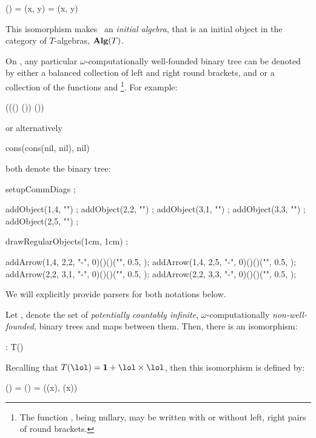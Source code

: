 \placeformula[+]\startformula\startalign
  \NC \alpha(\star) \NC =         \NR
  \NC \alpha(x, y)  \NC = (x, y) \NR
\stopalign\stopformula

\noindent This isomorphism makes \wflol\ an \emph{initial algebra}, 
that is an initial object in the category of $T$-algebras, 
$\bold{Alg}(T)$.

On , any particular $\omega$-computationally well-founded 
binary tree can be denoted by either a balanced collection of left and 
right round brackets, \quote{(} and \quote{)} or a collection of the 
functions  and \footnote{The function , 
being nullary, may be written with or without left, right pairs of round 
brackets.}. For example: 

\placeformula[+]\startformula\starttyping
((() ()) ())
\stoptyping\stopformula

\noindent or alternatively 

\placeformula[+]\startformula\starttyping
cons(cons(nil, nil), nil)
\stoptyping\stopformula

\noindent both denote the binary tree:

\placeformula[+]\startformula{}
  setupCommDiags ;
  
  addObject(1,4, "") ;
  addObject(2,2, "") ;
  addObject(3,1, "") ;
  addObject(3,3, "") ;
  addObject(2,5, "") ;
  
  drawRegularObjects(1cm, 1cm) ;
  
  addArrow(1,4, 2,2, "-", 0)()()("", 0.5, );
  addArrow(1,4, 2,5, "-", 0)()()("", 0.5, );
  addArrow(2,2, 3,1, "-", 0)()()("", 0.5, );
  addArrow(2,2, 3,3, "-", 0)()()("", 0.5, );

\stopMPcode\stopformula

\noindent We will explicitly provide parsers for both notations below. 

Let \lol, denote the set of \emph{potentially} \emph{countably infinite}, 
$\omega$-computationally \emph{non-well-founded}, binary trees and maps 
between them. Then, there is an isomorphism: 

\placesubformula\startformula
  \zeta : \lol \longRightIsoArrow T(\lol)
\stopformula

\noindent Recalling that $T(\lol) = \bold{1} + \lol \times \lol$, 
then this isomorphism is defined by: 

\placeformula[+]\startformula\startalign
  \NC \zeta() \NC = \star                          \NR
  \NC \zeta()   \NC = ((x), (x)) \NR
\stopalign\stopformula

